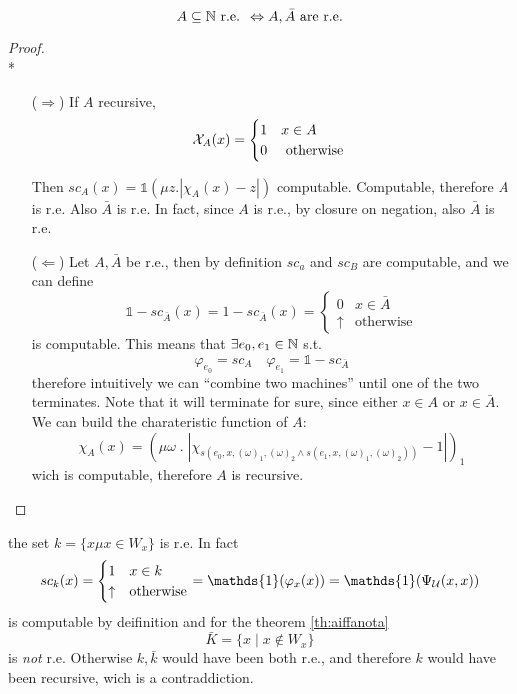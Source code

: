 \begin{theorem}\label{th:aiffanota}
  \[A \subseteq \mathbb{N} \mbox{ r.e. } \Leftrightarrow A, \bar{A} \mbox{
      are r.e.} \]
  \begin{proof}\mbox{}\\*
    \begin{itemize}
    \item[($\Rightarrow$)]
      If $A$ recursive,
      \begin{equation*}
        \mathcal{X}_A(x)= \begin{cases}
          1 & x\in A \\
          0 & $ otherwise $
        \end{cases}
      \end{equation*}
      
      Then $ sc_A(x) = \mathds{1}(\mu z. | \chi_A(x)- z | )$
      computable. Computable, therefore \textit{A} is r.e. Also
      $\bar{A}$ is r.e. In fact, since $A$ is r.e., by closure on
      negation, also $\bar{A}$ is r.e.

    \item[($\Leftarrow$)] Let $A, \bar{A}$ be r.e., then by definition
      $sc_a$ and $sc_B$ are computable, and we can define
      \[
        \mathds{1} - sc_{\bar{A}}(x) = 1 - sc_{\bar{A}}(x) = \begin{cases}
          0 & x \in \bar{A} \\
          \uparrow & \mbox{otherwise}
        \end{cases}
      \]
      is computable. This means that $\exists e_0, e_1 \in \mathbb{N}$ s.t.
      \[
        \varphi_{e_0} = sc_A \quad \varphi_{e_1} = \mathds{1} -
        sc_{\bar{A}}
      \]
      therefore intuitively we can ``combine two machines'' until one
      of the two terminates. Note that it will terminate for sure,
      since either $x \in A$ or $x \in \bar{A}$. We can build the
      charateristic function of $A$:
      \[
          \chi_A(x) = (\mu \omega \; . \; |\chi_{s(e_0, x,
            (\omega)_1, (\omega)_2 \wedge s(e_1, x, (\omega)_1,
            (\omega)_2))}-1|)_1
        \]
        wich is computable, therefore $A$ is recursive.
    \end{itemize}
  \end{proof}
\end{theorem}

\begin{observation}
  the set $k = \{x \mu x \in W_x\}$ is r.e. In fact
  \[
    sc_k(x) = \begin{cases}
      1 & x \in k \\
      \uparrow & \mbox{otherwise}
    \end{cases}
    = \mathds{1}(\varphi_x(x)) = \mathds{1}(\univ(x,x))
  \]
  is computable by deifinition and for the theorem \ref{th:aiffanota}
  \[
    \bar{K} = \{x \mid x \notin W_x\}
  \]
  is \emph{not} r.e. Otherwise $k,\bar{k}$ would have been both r.e.,
  and therefore $k$ would have been recursive, wich is a
  contraddiction.
\end{observation}

